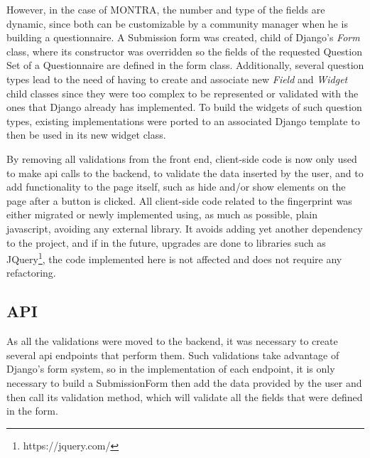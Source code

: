However, in the case of MONTRA, the number and type of the fields are dynamic, since both can be customizable by a community manager when he is building a questionnaire.
A Submission form was created, child of Django's \textit{Form} class, where its constructor was overridden so the fields of the requested Question Set of a Questionnaire are defined in the form class.
Additionally, several question types lead to the need of having to create and associate new \textit{Field} and \textit{Widget} child classes since they were too complex to be represented or validated with the ones that Django already has implemented.
To build the widgets of such question types, existing implementations were ported to an associated Django template to then be used in its new widget class.

By removing all validations from the front end, client-side code is now only used to make \gls{api} calls to the backend, to validate the data inserted by the user, and to add functionality to the page itself, such as hide and/or show elements on the page after a button is clicked.
All client-side code related to the fingerprint was either migrated or newly implemented using, as much as possible, plain javascript, avoiding any external library.
It avoids adding yet another dependency to the project, and if in the future, upgrades are done to libraries such as JQuery\footnote{https://jquery.com/}, the code implemented here is not affected and does not require any refactoring.

\subsection{API}


As all the validations were moved to the backend, it was necessary to create several \gls{api} endpoints that perform them.
Such validations take advantage of Django's form system, so in the implementation of each endpoint, it is only necessary to build a SubmissionForm then add the data provided by the user and then call its validation method, which will validate all the fields that were defined in the form.

